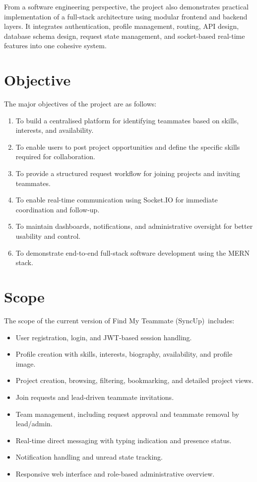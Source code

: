 \documentclass[12pt,a4paper,oneside]{report}
\newcommand{\projecttitle}{Find My Teammate (SyncUp)}
\begin{document}
From a software engineering perspective, the project also demonstrates practical implementation of a full-stack architecture using modular frontend and backend layers. It integrates authentication, profile management, routing, API design, database schema design, request state management, and socket-based real-time features into one cohesive system.

\section{Objective}
The major objectives of the project are as follows:
\begin{enumerate}[label=\arabic*.]
  \item To build a centralised platform for identifying teammates based on skills, interests, and availability.
  \item To enable users to post project opportunities and define the specific skills required for collaboration.
  \item To provide a structured request workflow for joining projects and inviting teammates.
  \item To enable real-time communication using Socket.IO for immediate coordination and follow-up.
  \item To maintain dashboards, notifications, and administrative oversight for better usability and control.
  \item To demonstrate end-to-end full-stack software development using the MERN stack.
\end{enumerate}

\section{Scope}
The scope of the current version of \projecttitle\ includes:
\begin{itemize}
  \item User registration, login, and JWT-based session handling.
  \item Profile creation with skills, interests, biography, availability, and profile image.
  \item Project creation, browsing, filtering, bookmarking, and detailed project views.
  \item Join requests and lead-driven teammate invitations.
  \item Team management, including request approval and teammate removal by lead/admin.
  \item Real-time direct messaging with typing indication and presence status.
  \item Notification handling and unread state tracking.
  \item Responsive web interface and role-based administrative overview.
\end{itemize}
\end{document}
